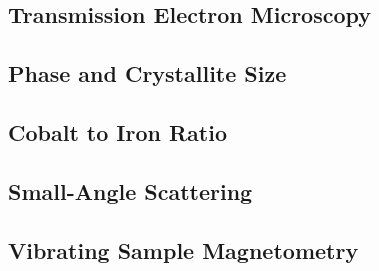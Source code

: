 \documentclass[\main/dresen_thesis.tex]{subfiles}
\renewcommand{\thisPath}{\main/chapters/monolayers/nanoparticles/}
\begin{document}
  \label{sec:monolayers:nanoparticles}

  \subsection{Transmission Electron Microscopy}
    
      \FloatBarrier

  \subsection{Phase and Crystallite Size}
  
    \FloatBarrier

  \subsection{Cobalt to Iron Ratio}
  
    \FloatBarrier

  \subsection{Small-Angle Scattering}
  
    \FloatBarrier

  \subsection{Vibrating Sample Magnetometry}
  
    \FloatBarrier

  
    \FloatBarrier
\end{document}
